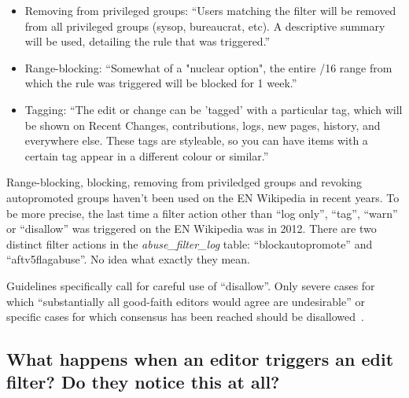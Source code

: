 \begin{itemize}
    \item Removing from privileged groups: ``Users matching the filter will be removed from all privileged groups (sysop, bureaucrat, etc). A descriptive summary will be used, detailing the rule that was triggered.''
    \item Range-blocking: ``Somewhat of a "nuclear option", the entire /16 range from which the rule was triggered will be blocked for 1 week.''
    \item Tagging: ``The edit or change can be 'tagged' with a particular tag, which will be shown on Recent Changes, contributions, logs, new pages, history, and everywhere else. These tags are styleable, so you can have items with a certain tag appear in a different colour or similar.''
\end{itemize}

Range-blocking, blocking, removing from priviledged groups and revoking autopromoted groups haven't been used on the EN Wikipedia in recent years. %
To be more precise, the last time a filter action other than ``log only'', ``tag'', ``warn'' or ``disallow'' was triggered on the EN Wikipedia was in 2012. %
There are two distinct filter actions in the \emph{abuse\_filter\_log} table: ``blockautopromote'' and ``aftv5flagabuse''.
No idea what exactly they mean.

Guidelines specifically call for careful use of ``disallow''.
Only severe cases for which ``substantially all good-faith editors would agree are undesirable'' or specific cases for which consensus has been reached should be disallowed~\cite{Wikipedia:EditFilter}.

\subsection{What happens when an editor triggers an edit filter? Do they notice this at all?}

